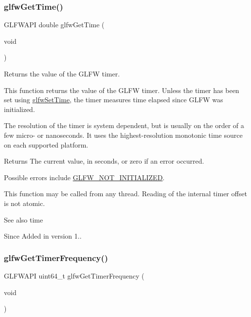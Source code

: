 \subsubsection{\texorpdfstring{glfw\+Get\+Time()}{glfwGetTime()}}
{\footnotesize\ttfamily G\+L\+F\+W\+A\+PI double glfw\+Get\+Time (\begin{DoxyParamCaption}\item[{void}]{ }\end{DoxyParamCaption})}



Returns the value of the G\+L\+FW timer. 

This function returns the value of the G\+L\+FW timer. Unless the timer has been set using \hyperlink{group__input_ga94360a3628a09f32708f83cc3fa48590}{glfw\+Set\+Time}, the timer measures time elapsed since G\+L\+FW was initialized.

The resolution of the timer is system dependent, but is usually on the order of a few micro-\/ or nanoseconds. It uses the highest-\/resolution monotonic time source on each supported platform.

\begin{DoxyReturn}{Returns}
The current value, in seconds, or zero if an error occurred.
\end{DoxyReturn}
Possible errors include \hyperlink{group__errors_ga2374ee02c177f12e1fa76ff3ed15e14a}{G\+L\+F\+W\+\_\+\+N\+O\+T\+\_\+\+I\+N\+I\+T\+I\+A\+L\+I\+Z\+ED}.

This function may be called from any thread. Reading of the internal timer offset is not atomic.

\begin{DoxySeeAlso}{See also}
time
\end{DoxySeeAlso}
\begin{DoxySince}{Since}
Added in version 1.. 
\end{DoxySince}
\mbox{\label{group__input_gaa92d10b10013372778efbf6367714371}} 
\subsubsection{\texorpdfstring{glfw\+Get\+Timer\+Frequency()}{glfwGetTimerFrequency()}}
{\footnotesize\ttfamily G\+L\+F\+W\+A\+PI uint64\+\_\+t glfw\+Get\+Timer\+Frequency (\begin{DoxyParamCaption}\item[{void}]{ }\end{DoxyParamCaption})}



